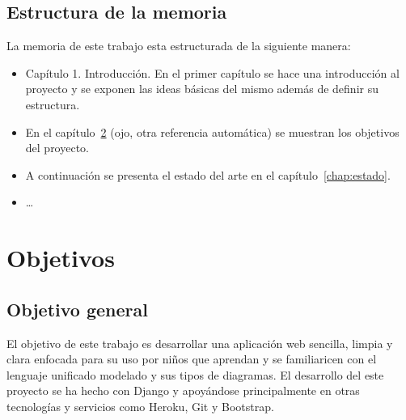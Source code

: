 \documentclass[a4paper, 12pt]{book}
\begin{document}
\section{Estructura de la memoria}
\label{sec:estructura}

La memoria de este trabajo esta estructurada de la siguiente manera: 

\begin{itemize}
  \item Capítulo 1. Introducción. En el primer capítulo se hace una introducción al proyecto y se exponen las ideas básicas del mismo además de definir su estructura. 
  
  \item En el capítulo~\ref{chap:objetivos} (ojo, otra referencia automática) se muestran los objetivos del proyecto.
  
  \item A continuación se presenta el estado del arte en el capítulo~\ref{chap:estado}.
  
  \item \ldots
\end{itemize}




\cleardoublepage %
\chapter{Objetivos} %
\label{chap:objetivos} %


\section{Objetivo general} %
\label{sec:objetivo-general} %

El objetivo de este trabajo es desarrollar una aplicación web sencilla, limpia y clara enfocada para su uso por niños que aprendan y se familiaricen con el lenguaje unificado modelado y sus tipos de diagramas. El desarrollo del este proyecto se ha hecho con Django y apoyándose principalmente en otras tecnologías y servicios como Heroku, Git y Bootstrap.
\end{document}
